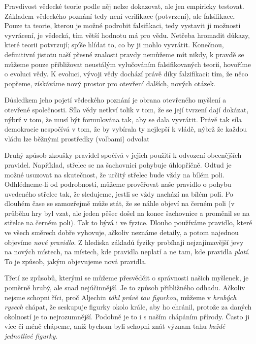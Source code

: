 \begin{tcnote}
      \tcblower
      Pravdivost vědecké teorie podle něj nelze dokazovat, ale jen empiricky testovat. Základem
      vědeckého poznání tedy není verifikace (potvrzení), ale falsifikace. Pouze ta teorie, kterou
      je možné podrobit falsifikaci, tedy vystavit ji možnosti vyvrácení, je vědecká, tím větší
      hodnotu má pro vědu. Netřeba hromadit důkazy, které teorii potvrzují; spíše hlídat to, co by
      ji mohlo vyvrátit. Konečnou, definitivní jistotu naší přesné znalosti pravdy nemůžeme mít
      nikdy, k pravdě se můžeme pouze přibližovat neustálým vylučováním falsifikovaných teorií,
      hovoříme o evoluci vědy. K evoluci, vývoji vědy dochází právě díky falzifikaci: tím, že něco
      popřeme, získáváme nový prostor pro otevření dalších, nových otázek.

      Důsledkem jeho pojetí vědeckého poznání je obrana otevřeného myšlení a otevřené společnosti.
      Síla vědy netkví tolik v tom, že se její tvrzení dají dokázat, nýbrž v tom, že musí být
      formulována tak, aby se dala vyvrátit. Právě tak síla demokracie nespočívá v tom, že by
      vybírala ty nejlepší k vládě, nýbrž že každou vládu lze běžnými prostředky (volbami) odvolat
    \end{tcnote}

    Druhý způsob zkoušky pravidel spočívá v jejich použití k odvození obecnějších pravidel. 
    Například, střelec se na šachovnici pohybuje úhlopříčně. Odtud je možné usuzovat na skutečnost, 
    že určitý střelec bude vždy na bílém poli. Odhlédneme-li od podrobností, můžeme prověřovat naše 
    pravidlo o pohybu uvedeného střelce tak, že sledujeme, jestli se vždy nachází na bílém poli. Po 
    dlouhém čase se samozřejmě může stát, že se náhle objeví na černém poli (v průběhu hry byl 
    vzat, ale jeden pěšec došel na konec šachovnice a proměnil se na střelce na černém poli). Tak 
    to bývá i ve fyzice. Dlouho používáme pravidlo, které ve všech směrech dobře vyhovuje, ačkoliv 
    neznáme detaily, a potom najednou objevíme \emph{nové pravidlo}. Z hlediska základů fyziky 
    probíhají nejzajímavější jevy na nových místech, na místech, kde pravidla neplatí a ne tam, kde 
    pravidla \emph{platí}. To je způsob, jakým objevujeme nová pravidla.

    Třetí ze způsobů, kterými se můžeme přesvědčit o správnosti našich myšlenek, je poměrně hrubý, 
    ale snad nejúčinnější. Je to způsob přibližného odhadu. Ačkoliv nejsme schopni říci, proč 
    Aljechin \emph{táhl právě tou figurkou}, můžeme v \emph{hrubých rysech} chápat, že seskupuje 
    figurky okolo krále, aby ho chránil, protože za daných okolností je to nejrozumnější. Podobně 
    je to i s naším chápáním přírody. Často ji více či méně chápeme, aniž bychom byli schopni znát 
    význam tahu \emph{každé jednotlivé figurky}.
    
